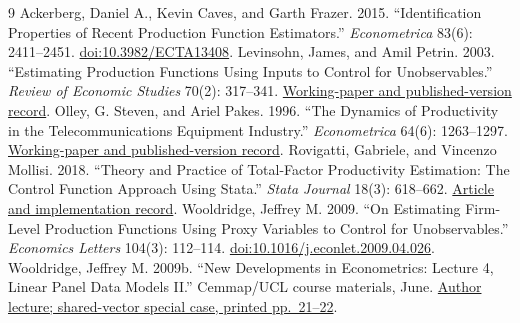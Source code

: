 \begin{thebibliography}{9}
 Ackerberg, Daniel A., Kevin Caves, and Garth Frazer. 2015. ``Identification Properties of Recent Production Function Estimators.'' \textit{Econometrica} 83(6): 2411--2451. \href{https://doi.org/10.3982/ECTA13408}{doi:10.3982/ECTA13408}.
 Levinsohn, James, and Amil Petrin. 2003. ``Estimating Production Functions Using Inputs to Control for Unobservables.'' \textit{Review of Economic Studies} 70(2): 317--341. \href{https://www.nber.org/papers/w7819}{Working-paper and published-version record}.
 Olley, G. Steven, and Ariel Pakes. 1996. ``The Dynamics of Productivity in the Telecommunications Equipment Industry.'' \textit{Econometrica} 64(6): 1263--1297. \href{https://www.nber.org/papers/w3977}{Working-paper and published-version record}.
 Rovigatti, Gabriele, and Vincenzo Mollisi. 2018. ``Theory and Practice of Total-Factor Productivity Estimation: The Control Function Approach Using Stata.'' \textit{Stata Journal} 18(3): 618--662. \href{https://www.stata-journal.com/article.html?article=st0537}{Article and implementation record}.
 Wooldridge, Jeffrey M. 2009. ``On Estimating Firm-Level Production Functions Using Proxy Variables to Control for Unobservables.'' \textit{Economics Letters} 104(3): 112--114. \href{https://doi.org/10.1016/j.econlet.2009.04.026}{doi:10.1016/j.econlet.2009.04.026}.
 Wooldridge, Jeffrey M. 2009b. ``New Developments in Econometrics: Lecture 4, Linear Panel Data Models II.'' Cemmap/UCL course materials, June. \href{https://www.cemmap.ac.uk/wp-content/legacy/resources/imbens_wooldridge/slides_4.pdf}{Author lecture; shared-vector special case, printed pp.~21--22}.
\end{thebibliography}

\GOneEnd
